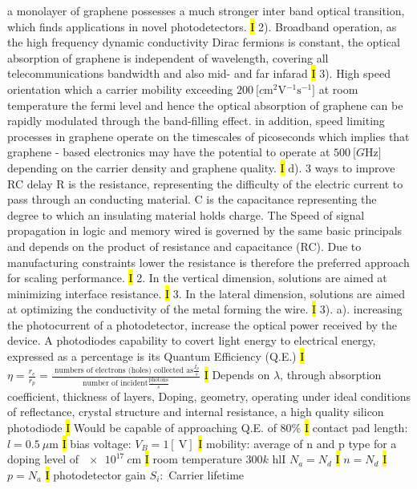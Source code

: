 \documentclass[fontsize=3]{scrartcl}
\begin{document}
a monolayer of graphene possesses a much stronger inter band optical transition, which finds applications in novel photodetectors.
\hl{I}
2). Broadband operation, as the high frequency dynamic conductivity Dirac fermions is constant, the optical absorption of graphene is independent of wavelength, covering all telecommunications bandwidth and also mid- and far infarad
\hl{I}
3). High speed orientation which a carrier mobility exceeding $\SI{200}{ [  c\meter^2 \volt^{-1} \second^{-1} ] }$ at room temperature the fermi level and hence the optical absorption of graphene can be rapidly modulated through the band-filling effect.
in addition, speed limiting processes in graphene operate on the timescales of picoseconds which implies that graphene - based electronics may have the potential to operate at $\SI{500}{ [  G\hertz ] }$ depending on the carrier density and graphene quality.
\hl{I}
d). 3 ways to improve RC delay R is the resistance, representing the difficulty of the electric current to pass through an conducting material. C is the capacitance representing the degree to which an insulating material holds charge.
The Speed of signal propagation in logic and memory wired is governed by the same basic principals and depends on the product of resistance and capacitance (RC).
Due to manufacturing constraints lower the resistance is therefore the preferred approach for scaling performance.
\hl{I}
2. In the vertical dimension, solutions are aimed at minimizing interface resistance.
\hl{I}
3. In the lateral dimension, solutions are aimed at optimizing the conductivity of the metal forming the wire.
\hl{I}
3). a). increasing the photocurrent of a photodetector, increase the optical power received by the device. A photodiodes capability to covert light energy to electrical energy, expressed as a percentage is its Quantum Efficiency (Q.E.)
\hl{I}
$\eta = \frac{r_e}{r_p} =\frac{ \text{ numbers of electrons (holes) collected as} \frac{I_p}{s} } {\text{number of incident} \frac{\text{photons}}{s} }$
\hl{I}
Depends on $\lambda$, through absorption coefficient, thickness of layers, Doping, geometry, operating under ideal conditions of reflectance, crystal structure and internal resistance, a high quality silicon photodiode
\hl{I}
Would be capable of approaching Q.E. of $80\%$
\hl{I}
contact pad length: $l = \SI{0.5}{\mu \meter}$
\hl{I}
bias voltage: $V_B = 1[ \SI{}{\volt} ]$
\hl{I}
mobility: average of n and p type for a doping level of $\SI{e17}{c\meter}$
\hl{I}
room temperature $300k$
hl{I}
$N_a = N_d$
\hl{I}
$n = N_d$
\hl{I}
$p=N_a$
\hl{I}
photodetector gain $S_i:$ Carrier lifetime
\end{document}
